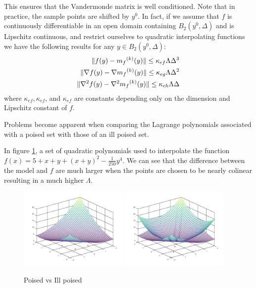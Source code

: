 This ensures that the Vandermonde matrix is well conditioned.
Note that in practice, the sample points are shifted by $y^0$.
In fact, if we assume that $f$ is continuously differentiable in an open domain containing $B_2(y^0, \Delta)$ and is Lipschitz continuous, and restrict ourselves to quadratic interpolating functions we have the following results for any $y \in B_2(y^0, \Delta)$:
\begin{align}
 \|f(y) - {{m}_f}^{(k)}(y)\| \le \kappa_{ef} \Lambda \Delta^3 \\
 \|\nabla f(y) - \nabla {{m}_f}^{(k)}(y)\| \le \kappa_{eg} \Lambda \Delta^2 \\
 \|\nabla^2 f(y) - \nabla^2 {{m}_f}^{(k)}(y)\| \le \kappa_{eh}\Lambda \Delta \\
\end{align}
where
$\kappa_{ef}, \kappa_{ef}$, and $\kappa_{ef}$ are constants depending only on the dimension and Lipschitz constant of $f$.

Problems become apparent when comparing the Lagrange polynomials associated with a poised set with those of an ill poised set.

In figure \ref{pvip}, a set of quadratic polynomials used to interpolate the function $f(x) = 5 + x + y + (x + y) ^ 2 - \frac 1 {250} y ^ 4$.
We can see that the difference between the model and $f$ are much larger when the points are chosen to be nearly colinear resulting in a much higher $\Lambda$.

\begin{figure}[h]
    \centering
    \includegraphics[width=200px]{images/poised_good.png}
    \includegraphics[width=200px]{images/poised_bad.png}
    \caption{Poised vs Ill poised}
    \label{pvip}
\end{figure}


